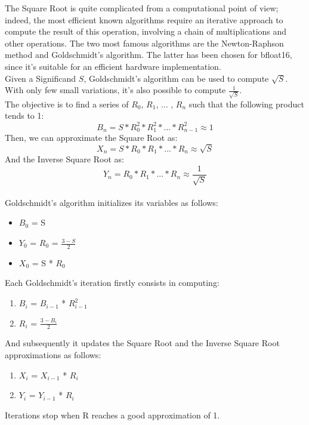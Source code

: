 The Square Root is quite complicated from a computational point of view; indeed, the most efficient known algorithms require an iterative approach to compute the result of this operation, involving a chain of multiplications and other operations. The two most famous algorithms are the Newton-Raphson method and Goldschmidt’s algorithm. The latter has been chosen for bfloat16, since it's suitable for an efficient hardware implementation. 
\\
Given a Significand $S$, Goldschmidt's algorithm can be used to compute $\sqrt{S}$. With only few small variations, it's also possible to compute $\frac{1}{\sqrt{S}}$.\\
The objective is to find a series of $R_0$, $R_1$, ... , $R_n$ such that the following product tends to 1:
$$B_n = S*R_0^{2}*R_1^{2}* ... * R_{n-1}^{2} \approx 1 $$
Then, we can approximate the Square Root as:
$$ X_{n} = S * R_0*R_1* ... * R_n \approx \sqrt{S} $$
And the Inverse Square Root as:
$$ Y_n =   R_0*R_1* ... * R_n \approx  \frac{1}{\sqrt{S}}$$
\\
Goldschmidt's algorithm initializes its variables as follows:

\begin{itemize}
\item $B_0$ = S
\item $Y_0$ = $R_0$ = $\frac{3-S}{2}$
\item $X_0$ = S * $R_0$
\end{itemize}

\noindent Each Goldschmidt's iteration firstly consists in computing:

\begin{enumerate}
\item $B_i$ = $B_{i-1}$ * $R_{i-1}^{2}$
\item $R_i$ = $\frac{3-B_i}{2}$
\end{enumerate}

\noindent And subsequently it updates the Square Root and the Inverse Square Root approximations as follows:
\begin{enumerate}
\item $X_i$ = $X_{i-1}$ * $R_i$
\item $Y_i$ = $Y_{i-1}$ * $R_i$
\end{enumerate}

\noindent Iterations stop when R reaches a good approximation of 1.\\

